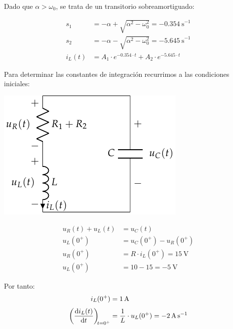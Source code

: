 \vspace{3mm}
Dado que $\alpha > \omega_0$, se trata de un transitorio
sobreamortiguado:

\begin{align*}
  s_1 &= -\alpha + \sqrt{\alpha^2 - \omega_0^2} = \SI{-0.354}{\second}^{-1}\\
  s_2 &= -\alpha - \sqrt{\alpha^2 - \omega_0^2} = \SI{-5.645}{\second}^{-1}\\
  i_L(t) &= A_1 \cdot e^{-0.354 \cdot t} + A_2 \cdot e^{-5.645 \cdot t}
\end{align*}

\vspace{3mm}
Para determinar las constantes de integración recurrimos a las
condiciones iniciales:

\vspace{3mm}
\begin{minipage}{0.3\textwidth}
  \includegraphics[scale=1]{figuras/FM_4_8_natural}
\end{minipage}
\begin{minipage}{0.7\textwidth}
  \begin{align*}
    u_R(t) + u_L(t) &= u_C(t)\\
    u_L(0^+) &= u_C(0^+) - u_R(0^+)\\
    u_R(0^+) &= R \cdot i_L(0^+) = \SI{15}{\volt}\\
    u_L(0^+) &= 10 - 15 = \SI{-5}{\volt}
  \end{align*}
\end{minipage}

\vspace{5mm}
Por tanto:
\begin{align*}
  i_L(0^+) &= \SI{1}{\ampere}\\[3pt]
  \diff{i_L(t)}{t}[t = 0^+] &= \frac{1}{L} \cdot u_L(0^+) = \SI{-2}{\ampere\per\second}
\end{align*}

